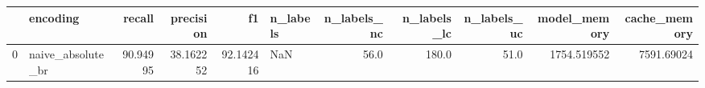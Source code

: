 \begin{tabular}{llrrrlrrrrr}
\toprule
{} &           encoding &    recall &  precision &         f1 & n\_labels &  n\_labels\_nc &  n\_labels\_lc &  n\_labels\_uc &  model\_memory &  cache\_memory \\
\midrule
0 &  naive\_absolute\_br &  90.94995 &  38.162252 &  92.142416 &      NaN &         56.0 &        180.0 &         51.0 &   1754.519552 &    7591.69024 \\
\bottomrule
\end{tabular}
